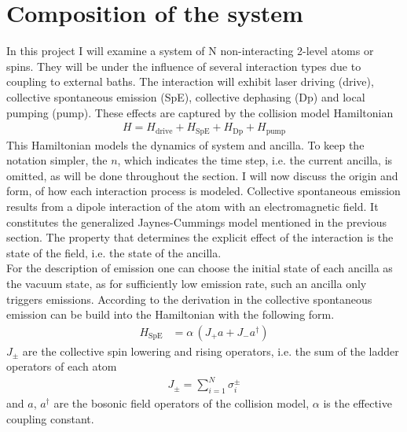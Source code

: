 \section{Composition of the system}\label{sec:composition_of_model}
In this project I will examine a system of N non-interacting 2-level atoms or spins. They will be under the influence of several interaction types due to coupling to external baths. The interaction will exhibit laser driving (drive), collective spontaneous emission (SpE), collective dephasing (Dp) and local pumping (pump). These effects are captured by the collision model Hamiltonian 
\begin{align}
    H = H_\text{drive}+H_\text{SpE}+H_\text{Dp}+H_\text{pump}
\end{align}
This Hamiltonian models the dynamics of system and ancilla. To keep the notation simpler, the $n$, which indicates the time step, i.e. the current ancilla, is omitted, as will be done throughout the section. I will now discuss the origin and form, of how each interaction process is modeled.
Collective spontaneous emission results from a dipole interaction of the atom with an electromagnetic field. It constitutes the generalized Jaynes-Cummings model mentioned in the previous section. The property that determines the explicit effect of the interaction is the state of the field, i.e. the state of the ancilla.\\
For the description of emission one can choose the initial state of each ancilla as the vacuum state, as for sufficiently low emission rate, such an ancilla only triggers emissions. According to the derivation in  the collective spontaneous emission can be build into the Hamiltonian with the following form.
\begin{align*}
    H_\text{SpE}&=\alpha\,(J_+a + J_-a^\dagger)
\end{align*}
$J_\pm$ are the collective spin lowering and rising operators, i.e. the sum of the ladder operators of each atom 
\begin{align*}
    J_\pm=\sum_{i=1}^N\sigma^\pm_i
\end{align*}
and $a$, $a^\dagger$ are the bosonic field operators of the collision model, $\alpha$ is the effective coupling constant.\\\\


